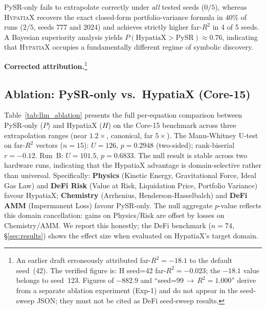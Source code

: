 \documentclass[twoside,11pt]{article}
\newcommand{\Rsq}{R^{2}}
\begin{document}
PySR-only fails to extrapolate correctly under \emph{all} tested seeds ($0/5$),
whereas \textsc{HypatiaX} recovers the exact closed-form portfolio-variance formula
in $40\%$ of runs ($2/5$, seeds 777 and 2024) and achieves strictly higher far-$\Rsq$
in 4 of 5 seeds.  A Bayesian superiority analysis yields
$P(\text{HypatiaX} > \text{PySR}) \approx 0.76$, indicating that \textsc{HypatiaX}
occupies a fundamentally different regime of symbolic discovery.

\textbf{Corrected attribution.}\footnote{An earlier draft erroneously attributed
far-$\Rsq=-18.1$ to the default seed~(42).  The verified figure is: H seed=42
far-$\Rsq=-0.023$; the $-18.1$ value belongs to seed~123.  Figures of $-882.9$ and
``seed=99\,$\to$\,$\Rsq=1.000$'' derive from a separate ablation experiment (Exp-1)
and do not appear in the seed-sweep JSON; they must not be cited as DeFi seed-sweep
results.}

\subsection{Ablation: PySR-only vs.\ HypatiaX (Core-15)}
\label{sec:ablation_core15}

Table~\ref{tab:llm_ablation} presents the full per-equation comparison between
PySR-only ($P$) and HypatiaX ($H$) on the Core-15 benchmark across three
extrapolation ranges (near $1.2\times$, canonical, far $5\times$).  The
Mann-Whitney U-test on far-$\Rsq$ vectors ($n=15$): $U=126$, $p=0.2948$
(two-sided); rank-biserial $r=-0.12$.  Run~B: $U=101.5$, $p=0.6833$.
The null result is stable across two hardware runs, indicating that the
HypatiaX advantage is domain-selective rather than universal.  Specifically:
\textbf{Physics} (Kinetic Energy, Gravitational Force, Ideal Gas Law) and
\textbf{DeFi Risk} (Value at Risk, Liquidation Price, Portfolio Variance) favour
HypatiaX; \textbf{Chemistry} (Arrhenius, Henderson-Hasselbalch) and
\textbf{DeFi AMM} (Impermanent Loss) favour PySR-only.  The null aggregate
$p$-value reflects this domain cancellation: gains on Physics/Risk are offset by
losses on Chemistry/AMM.  We report this honestly; the DeFi benchmark
($n=74$, §\ref{sec:results}) shows the effect size when evaluated on
HypatiaX's target domain.
\end{document}
